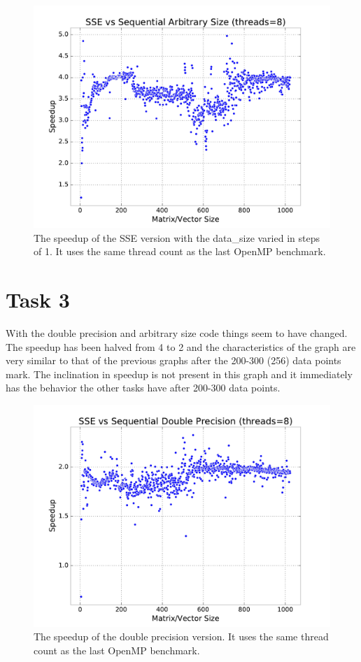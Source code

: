 \documentclass[final]{report}
\begin{document}
\begin{figure}[H]
\centering
    \includegraphics[width=\linewidth]{resources/sse-data-size-sweep-arbitrary.pdf}
    \caption{The speedup of the SSE version with the data\_size varied in steps of 1. It uses the same thread count as the last OpenMP benchmark.}
    \label{fig:sse-data-size-sweep-arbitrary}
\end{figure}


\section{Task 3}
With the double precision and arbitrary size code things seem to have changed.
The speedup has been halved from 4 to 2 and the characteristics of the graph are very similar to that of the previous graphs after the 200-300 (256) data points mark.
The inclination in speedup is not present in this graph and it immediately has the behavior the other tasks have after 200-300 data points.

\begin{figure}[H]
\centering
    \includegraphics[width=\linewidth]{resources/sse-dp.pdf}
    \caption{The speedup of the double precision version. It uses the same thread count as the last OpenMP benchmark.}
    \label{fig:sse-dp}
\end{figure}
\end{document}
